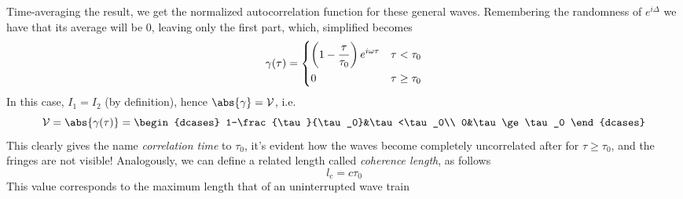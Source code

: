\documentclass[../electromagnetism.tex]{subfiles}
\begin{document}
Time-averaging the result, we get the normalized autocorrelation function for these general waves. Remembering the randomness of $e^{i\Delta}$ we have that its average will be $0$, leaving only the first part, which, simplified becomes
\begin{equation}
	\gamma(\tau)=\begin{dcases}
			\left( 1-\frac{\tau}{\tau_0} \right)e^{i\omega\tau}&\tau<\tau_0\\
			0&\tau\ge\tau_0
		\end{dcases}
	\label{eq:generalautocorrelation}
\end{equation}
In this case, $I_1=I_2$ (by definition), hence $\abs{\gamma}=\mathcal{V}$, i.e.
\begin{equation}
	\mathcal{V}=\abs{\gamma(\tau)}=\begin{dcases}
			1-\frac{\tau}{\tau_0}&\tau<\tau_0\\
			0&\tau\ge\tau_0
		\end{dcases}
	\label{eq:visibilityequalwaves}
\end{equation}
This clearly gives the name \emph{correlation time} to $\tau_0$, it's evident how the waves become completely uncorrelated after for $\tau\ge\tau_0$, and the fringes are not visible!
Analogously, we can define a related length called \emph{coherence length}, as follows
\begin{equation}
	l_c=c\tau_0
	\label{eq:coherencelength}
\end{equation}
This value corresponds to the maximum length that of an uninterrupted wave train
\end{document}
